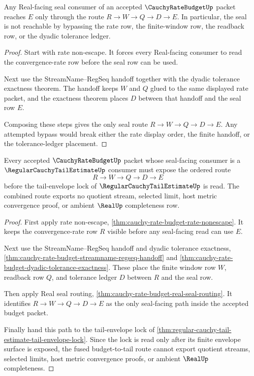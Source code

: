 \begin{theorem}
\label{thm:cauchy-rate-budget-real-seal-routing}
Any Real-facing seal consumer of an accepted $\CauchyRateBudgetUp$ packet reaches $E$ only through the route $R \to W \to Q \to D \to E$. In particular, the seal is not reachable by bypassing the rate row, the finite-window row, the readback row, or the dyadic tolerance ledger.
\end{theorem}
\begin{proof}
Start with rate non-escape. It forces every Real-facing consumer to read the convergence-rate row before the seal row can be used.

Next use the StreamName--RegSeq handoff together with the dyadic tolerance exactness theorem. The handoff keeps $W$ and $Q$ glued to the same displayed rate packet, and the exactness theorem places $D$ between that handoff and the seal row $E$.

Composing these steps gives the only seal route $R \to W \to Q \to D \to E$. Any attempted bypass would break either the rate display order, the finite handoff, or the tolerance-ledger placement.
\end{proof}

\begin{theorem}
\label{thm:cauchy-rate-budget-regular-tail-estimate-handoff}
Every accepted $\CauchyRateBudgetUp$ packet whose seal-facing consumer is a $\RegularCauchyTailEstimateUp$ consumer must expose the ordered route
$$
R \to W \to Q \to D \to E
$$
before the tail-envelope lock of $\RegularCauchyTailEstimateUp$ is read. The combined route exports no quotient stream, selected limit, host metric convergence proof, or ambient $\RealUp$ completeness row.
\end{theorem}
\begin{proof}
First apply rate non-escape, \autoref{thm:cauchy-rate-budget-rate-nonescape}. It keeps the convergence-rate row $R$ visible before any seal-facing read can use $E$.

Next use the StreamName--RegSeq handoff and dyadic tolerance exactness, \autoref{thm:cauchy-rate-budget-streamname-regseq-handoff} and \autoref{thm:cauchy-rate-budget-dyadic-tolerance-exactness}. These place the finite window row $W$, readback row $Q$, and tolerance ledger $D$ between $R$ and the seal row.

Then apply Real seal routing, \autoref{thm:cauchy-rate-budget-real-seal-routing}. It identifies $R \to W \to Q \to D \to E$ as the only seal-facing path inside the accepted budget packet.

Finally hand this path to the tail-envelope lock of \autoref{thm:regular-cauchy-tail-estimate-tail-envelope-lock}. Since the lock is read only after its finite envelope surface is exposed, the fused budget-to-tail route cannot export quotient streams, selected limits, host metric convergence proofs, or ambient $\RealUp$ completeness.
\end{proof}

